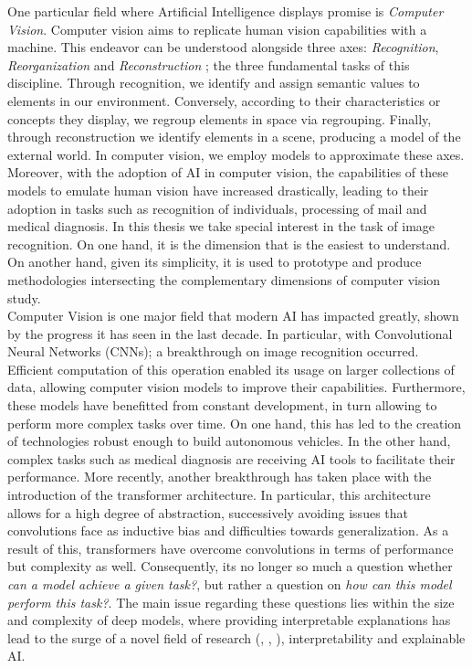 \noindent One particular field where Artificial Intelligence displays promise is \emph{Computer 
Vision}. Computer vision aims to replicate human vision capabilities with a machine. This endeavor 
can be understood alongside three axes: \emph{Recognition}, \emph{Reorganization} and 
\emph{Reconstruction} \autocite{malik2016three}; the three fundamental tasks of this discipline.
Through recognition, we identify and assign semantic values to elements in our environment. 
Conversely, according to their characteristics or concepts they display, we regroup elements 
in space via regrouping. Finally, through reconstruction we identify elements in a scene, producing 
a model of the external world. In computer vision, we employ models to approximate these axes. 
Moreover, with the adoption of AI in computer vision, the capabilities of these models to emulate 
human vision have increased drastically, leading to their adoption in tasks such as recognition of 
individuals, processing of mail and medical diagnosis. In this thesis we  take special interest in 
the task of image recognition. On one hand, it is the dimension that is the easiest to understand. 
On another hand, given its simplicity, it is used to prototype and produce methodologies 
intersecting the complementary dimensions of computer vision study.\\

\noindent Computer Vision is one major field that modern AI has impacted greatly, shown by the 
progress it has seen in the last decade. In particular, with Convolutional Neural Networks (CNNs); a 
breakthrough on image recognition occurred. Efficient computation of this 
operation enabled its usage on larger collections of data, allowing computer vision models to 
improve their capabilities. Furthermore, these models have benefitted from constant development, in 
turn allowing to perform more complex tasks over time. On one hand, this has led to the creation 
of technologies robust enough to build autonomous vehicles. In the other hand, complex tasks such  
as medical diagnosis are receiving AI tools to facilitate their performance. More recently, another 
breakthrough has taken place with the introduction of the transformer architecture. 
In particular, this architecture allows for a high degree of abstraction, successively avoiding 
issues that convolutions face as inductive bias and difficulties  towards generalization. As a 
result of this, transformers have overcome convolutions in terms of performance but complexity as 
well. Consequently, its no longer so much a question whether \textit{can a model achieve a given 
task?}, but rather a question on \textit{how can this model perform this task?}. The main 
issue regarding these questions lies within the size and complexity of deep models, where 
providing interpretable explanations has lead to the surge of a novel field of research 
(\cite{li2018deep}, \cite{guidotti2018survey}, \cite{bodria2021benchmarking}), interpretability 
and explainable AI.\\

